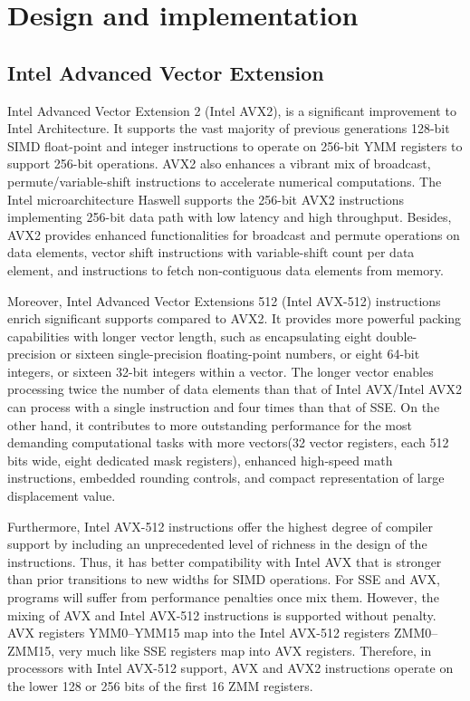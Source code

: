 \documentclass[5p,times,twocolumn]{elsarticle}
\begin{document}
\section{Design and implementation}\label{sec:design}
\subsection{Intel Advanced Vector Extension}
Intel Advanced Vector Extension 2 (Intel AVX2), is a significant improvement to Intel Architecture.
It supports the vast majority of previous generations 128-bit SIMD float-point
and integer instructions to operate on 256-bit YMM registers to support 256-bit operations.
%
AVX2 also enhances a vibrant mix of broadcast, permute/variable-shift instructions to accelerate
numerical computations. The Intel microarchitecture Haswell supports the 256-bit AVX2 instructions
implementing 256-bit data path with low latency and high throughput.
Besides, AVX2 provides enhanced functionalities for broadcast and permute operations on data elements,
vector shift instructions with variable-shift count per data element,
and instructions to fetch non-contiguous data elements from memory.

Moreover, Intel Advanced Vector Extensions 512 (Intel AVX-512) instructions
enrich significant supports compared to AVX2. It provides more powerful packing
capabilities with longer vector length, such as encapsulating eight double-precision
or sixteen single-precision floating-point numbers,
or eight 64-bit integers, or sixteen 32-bit integers within a vector.
The longer vector enables processing twice the number of data elements
than that of Intel AVX/Intel AVX2 can
process with a single instruction and four times than that of SSE.
On the other hand, it contributes to more outstanding performance for the most
demanding computational tasks with more vectors(32 vector registers, each 512 bits wide,
eight dedicated mask registers), enhanced high-speed math instructions, embedded rounding controls,
and compact representation of large displacement value.

Furthermore, Intel AVX-512 instructions offer the highest degree of compiler
support by including an unprecedented level of richness in the design of the instructions.
Thus, it has better compatibility with Intel AVX that is stronger than
prior transitions to new widths for SIMD operations.
For SSE and AVX, programs will suffer from performance penalties once mix them.
However, the mixing of AVX and Intel AVX-512 instructions is supported without penalty.
AVX registers YMM0--YMM15 map into the Intel AVX-512 registers
ZMM0--ZMM15, very much like SSE registers map into AVX registers. Therefore, in processors with
Intel AVX-512 support, AVX and AVX2 instructions operate on the lower 128 or 256 bits of the first 16 ZMM registers.
\end{document}
